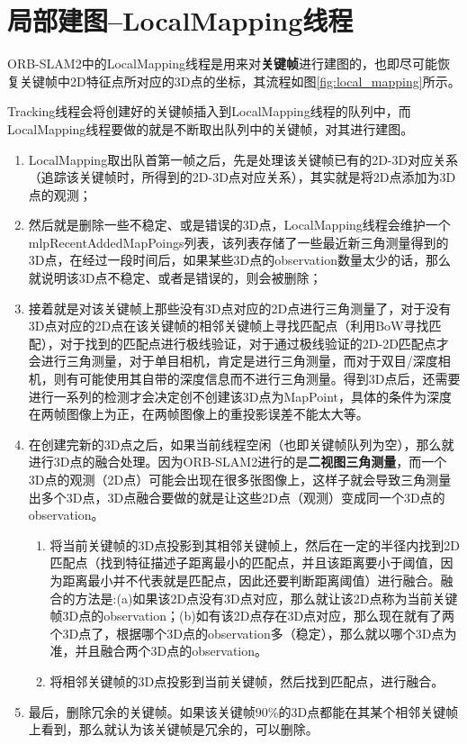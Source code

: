 \section{局部建图--LocalMapping线程}

ORB-SLAM2中的LocalMapping线程是用来对\textbf{关键帧}进行建图的，也即尽可能恢复关键帧中2D特征点所对应的3D点的坐标，其流程如图\ref{fig:local_mapping}所示。

Tracking线程会将创建好的关键帧插入到LocalMapping线程的队列中，而LocalMapping线程要做的就是不断取出队列中的关键帧，对其进行建图。

\begin{enumerate}
	\item LocalMapping取出队首第一帧之后，先是处理该关键帧已有的2D-3D对应关系（追踪该关键帧时，所得到的2D-3D点对应关系），其实就是将2D点添加为3D点的观测；
	\item 然后就是删除一些不稳定、或是错误的3D点，LocalMapping线程会维护一个mlpRecentAddedMapPoings列表，该列表存储了一些最近新三角测量得到的3D点，在经过一段时间后，如果某些3D点的observation数量太少的话，那么就说明该3D点不稳定、或者是错误的，则会被删除；
	\item 接着就是对该关键帧上那些没有3D点对应的2D点进行三角测量了，对于没有3D点对应的2D点在该关键帧的相邻关键帧上寻找匹配点（利用BoW寻找匹配），对于找到的匹配点进行极线验证，对于通过极线验证的2D-2D匹配点才会进行三角测量，对于单目相机，肯定是进行三角测量，而对于双目/深度相机，则有可能使用其自带的深度信息而不进行三角测量。得到3D点后，还需要进行一系列的检测才会决定创不创建该3D点为MapPoint，具体的条件为深度在两帧图像上为正，在两帧图像上的重投影误差不能太大等。
	\item 在创建完新的3D点之后，如果当前线程空闲（也即关键帧队列为空），那么就进行3D点的融合处理。因为ORB-SLAM2进行的是\textbf{二视图三角测量}，而一个3D点的观测（2D点）可能会出现在很多张图像上，这样子就会导致三角测量出多个3D点，3D点融合要做的就是让这些2D点（观测）变成同一个3D点的observation。\begin{enumerate}[(1)]
		\item 将当前关键帧的3D点投影到其相邻关键帧上，然后在一定的半径内找到2D匹配点（找到特征描述子距离最小的匹配点，并且该距离要小于阈值，因为距离最小并不代表就是匹配点，因此还要判断距离阈值）进行融合。融合的方法是:(a)如果该2D点没有3D点对应，那么就让该2D点称为当前关键帧3D点的observation；(b)如有该2D点存在3D点对应，那么现在就有了两个3D点了，根据哪个3D点的observation多（稳定），那么就以哪个3D点为准，并且融合两个3D点的observation。
		\item 将相邻关键帧的3D点投影到当前关键帧，然后找到匹配点，进行融合。
		\end{enumerate}
	\item 最后，删除冗余的关键帧。如果该关键帧90\%的3D点都能在其某个相邻关键帧上看到，那么就认为该关键帧是冗余的，可以删除。

\end{enumerate}



